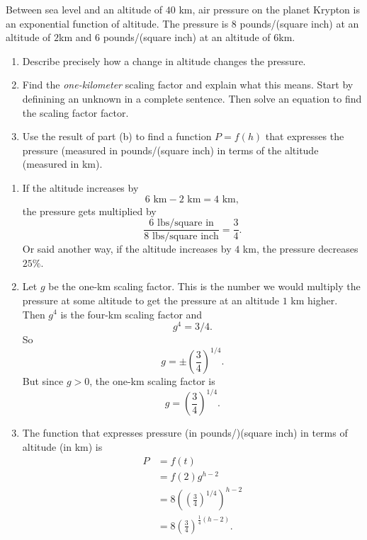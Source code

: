 \documentclass{ximera}
\begin{document}
\begin{question} \label{Qoece1}
Between sea level and an altitude of $40$ km, air pressure on the planet Krypton is an exponential function of altitude. The pressure is $8$ pounds/(square inch) at an altitude of $2$km and $6$ pounds/(square inch) at an altitude of $6$km.
\begin{enumerate}
\item Describe precisely how a change in altitude changes the pressure.

\item Find the \emph{one-kilometer} scaling factor and explain what this means. Start by definining an unknown in a complete sentence. Then solve an equation to find the scaling factor factor.

\item Use the result of part (b) to find a function $P=f(h)$ that expresses the pressure (measured in pounds/(square inch) in terms of the altitude (measured in km). 

\end{enumerate}

\begin{explanation}
\begin{enumerate}
\item If the altitude increases by 
\[
    6 \text{ km} - 2\text{ km} = 4 \text{ km},
\]
the pressure gets multiplied by
\[
 \frac{6\text{ lbs/square in}}{8 \text{ lbs/square inch}} = \frac{3}{4}.
\]
Or said another way, if the altitude increases by $4$ km, the pressure decreases $25\%$.

\item Let $g$ be the one-km scaling factor. This is the number we would multiply the pressure at some altitude to get the pressure at an altitude $1$ km higher. Then $g^4$ is the four-km scaling factor and 
\[
   g^4 = 3/4.
\]
So
\[
 g= \pm \left( \frac{3}{4} \right)^{1/4}.
\]
But since $g>0$, the one-km scaling factor is 
\[
 g = \left( \frac{3}{4} \right)^{1/4}.
\]

\item The function that expresses pressure (in pounds/)(square inch) in terms of altitude (in km) is
\begin{align*}
  P &= f(t)  \\
     &= f(2) g^{h-2} \\
     &= 8 \left(\left( \frac{3}{4} \right)^{1/4}\right)^{h-2}  \\
     &= 8 \left( \frac{3}{4} \right)^{\frac{1}{4}\left( h-2 \right)} .
\end{align*}
\end{enumerate}
\end{explanation}

\end{question}
\end{document}
